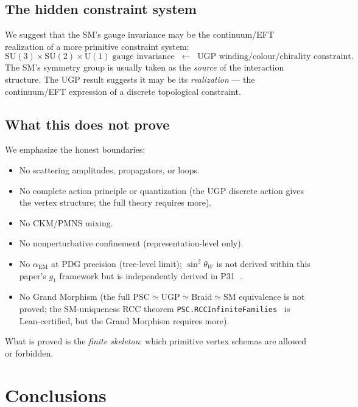 \documentclass[12pt]{article}
\theoremstyle{remark}
\newcommand{\sinW}{\sin^2\!\theta_W}
\begin{document}
\subsection{The hidden constraint system}

We suggest that the SM's gauge invariance may be the continuum/EFT realization
of a more primitive constraint system:
\begin{equation}
  \mathrm{SU}(3)\times\mathrm{SU}(2)\times\mathrm{U}(1)
  \;\text{gauge invariance}
  \;\;\longleftarrow\;\;
  \text{UGP winding/colour/chirality constraint}.
\end{equation}
The SM's symmetry group is usually taken as the \emph{source} of the interaction
structure.  The UGP result suggests it may be its \emph{realization} --- the
continuum/EFT expression of a discrete topological constraint.

\subsection{What this does not prove}

We emphasize the honest boundaries:
\begin{itemize}
  \item No scattering amplitudes, propagators, or loops.
  \item No complete action principle or quantization (the UGP discrete action
    gives the vertex structure; the full theory requires more).
  \item No CKM/PMNS mixing.
  \item No nonperturbative confinement (representation-level only).
  \item No $\alpha_\mathrm{EM}$ at PDG precision (tree-level limit); $\sinW$ is not derived within this paper's $g_1$ framework but is independently derived in P31~\cite{SpivackWeinbergAngle}.
  \item No Grand Morphism (the full PSC$\simeq$UGP$\simeq$Braid$\simeq$SM equivalence is not proved; the SM-uniqueness RCC theorem \texttt{PSC.RCCInfiniteFamilies}~\cite{ugp-lean} is Lean-certified, but the Grand Morphism requires more).
\end{itemize}
What is proved is the \emph{finite skeleton}: which primitive vertex schemas
are allowed or forbidden.

\section{Conclusions}
\label{sec:conclusions}
\end{document}
